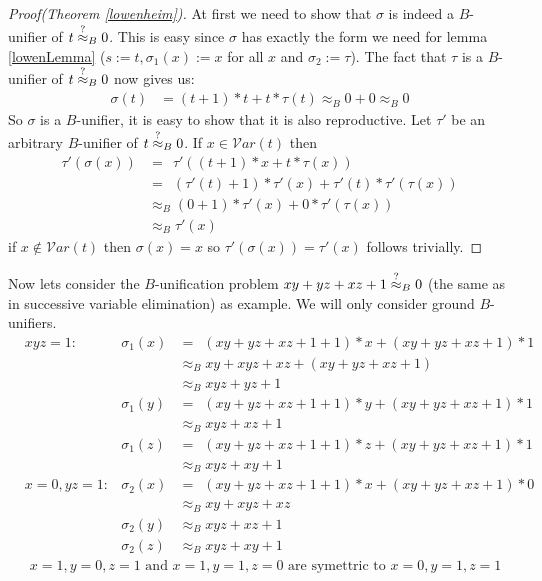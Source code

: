 		\begin{proof}[Proof(Theorem \ref{lowenheim})]
		At first we need to show that $\sigma$ is indeed a $B$-unifier of $t\stackrel{?}{\approx}_B0$. This is easy since $\sigma$ has exactly the form we need for lemma \ref{lowenLemma} ($s:=t,\sigma_1(x):=x$ for all $x$ and $\sigma_2:=\tau$). The fact that $\tau$ is a $B$-unifier of $t\stackrel{?}{\approx}_B0$ now gives us:
		\begin{align*}
		\sigma(t)&=(t+1)*t+t*\tau(t)
		\approx_B0+0
		\approx_B0
		\end{align*}
		So $\sigma$ is a $B$-unifier, it is easy to show that it is also reproductive. Let $\tau'$ be an arbitrary $B$-unifier of $t\stackrel{?}{\approx}_B0$. If $x\in\mathcal{V}ar(t)$ then
		\begin{align*}
		\tau'(\sigma(x))&=\ \ \tau'((t+1)*x+t*\tau(x))\\
		&=\ \ (\tau'(t)+1)*\tau'(x)+\tau'(t)*\tau'(\tau(x))\\
		&\approx_B(0+1)*\tau'(x)+0*\tau'(\tau(x))\\
		&\approx_B\tau'(x)
		\end{align*}
		if $x\notin\mathcal{V}ar(t)$ then $\sigma(x)=x$ so $\tau'(\sigma(x))=\tau'(x)$ follows trivially.
		\end{proof}
		Now lets consider the $B$-unification problem $xy+yz+xz+1\stackrel{?}{\approx}_B0$ (the same as in successive variable elimination) as example. We will only consider ground $B$-unifiers.
		\begin{align*}
		& xyz=1:& \sigma_1(x)&=\ \ (xy+yz+xz+1+1)*x+(xy+yz+xz+1)*1\\
		&&&\approx_Bxy+xyz+xz+(xy+yz+xz+1)\\
		&&&\approx_Bxyz+yz+1\\
		&&\sigma_1(y)&=\ \ (xy+yz+xz+1+1)*y+(xy+yz+xz+1)*1\\
		&&&\approx_Bxyz+xz+1\\
		&&\sigma_1(z)&=\ \ (xy+yz+xz+1+1)*z+(xy+yz+xz+1)*1\\
		&&&\approx_Bxyz+xy+1\\
		& x=0,yz=1:& \sigma_2(x)&=\ \ (xy+yz+xz+1+1)*x+(xy+yz+xz+1)*0\\
		&&&\approx_Bxy+xyz+xz\\
		&&\sigma_2(y)&\approx_Bxyz+xz+1\\
		&&\sigma_2(z)&\approx_Bxyz+xy+1
		\end{align*}
		\begin{align*}
		& x=1,y=0,z=1\text{ and }x=1,y=1,z=0\text{ are symettric to }x=0,y=1,z=1
		\end{align*} 
